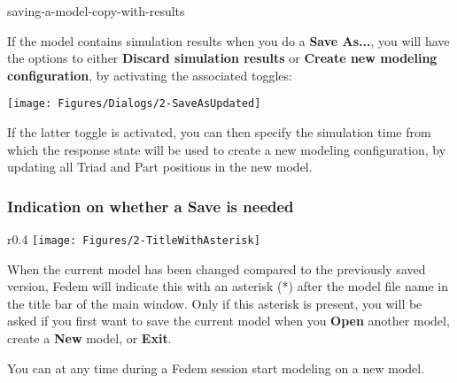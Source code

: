               {saving-a-model-copy-with-results}

If the model contains simulation results when you do a \textbf{Save As...},
you will have the options to either \textbf{Discard simulation results} or
\textbf{Create new modeling configuration}, by activating the
associated toggles:

\begin{center}
  \texttt{[image: Figures/Dialogs/2-SaveAsUpdated]}
\end{center}

If the latter toggle is activated, you can then specify the simulation
time from which the response state will be used to create a
new modeling configuration, by updating all Triad and Part
positions in the new model.

\subsubsection{Indication on whether a Save is needed}

\begin{wrapfigure}[5]{r}{0.4\textwidth} \vskip-4mm
  \texttt{[image: Figures/2-TitleWithAsterisk]}
\end{wrapfigure}

When the current model has been changed compared to the previously saved
version, Fedem will indicate this with an asterisk (*) after
the model file name in the title bar of the main window.
Only if this asterisk is present, you will be asked if you
first want to save the current model when you \textbf{Open} another model,
create a \textbf{New} model, or \textbf{Exit}.



You can at any time during a Fedem session start modeling on a new model.




